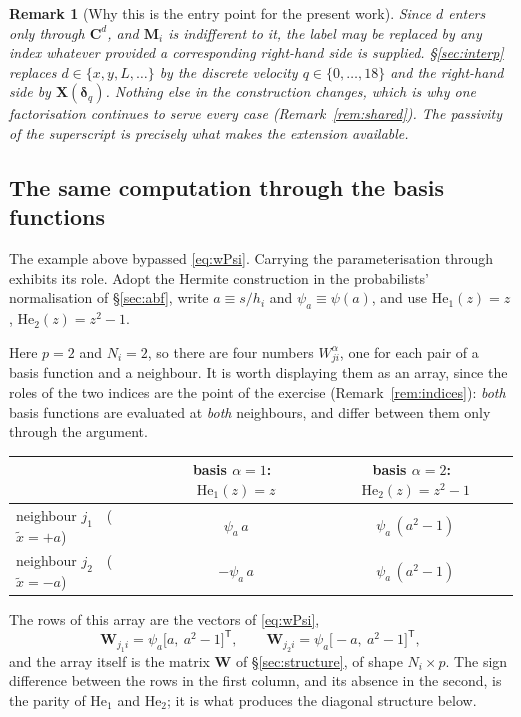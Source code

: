 \documentclass[11pt,a4paper]{article}
\newtheorem{remark}{Remark}
\begin{document}
\begin{remark}[Why this is the entry point for the present work]
\label{rem:d-to-q}
Since $d$ enters only through $\bm C^{d}$, and $\bm M_i$ is indifferent to it, the label
may be replaced by any index whatever provided a corresponding right-hand side is
supplied. \S\ref{sec:interp} replaces $d\in\{x,y,L,\dots\}$ by the discrete velocity
$q\in\{0,\dots,18\}$ and the right-hand side by $\bm X(\bm\delta_q)$. Nothing else in
the construction changes, which is why one factorisation continues to serve every case
(Remark~\ref{rem:shared}). The passivity of the superscript is precisely what makes the
extension available.
\end{remark}

\subsection{The same computation through the basis functions}

The example above bypassed \eqref{eq:wPsi}. Carrying the parameterisation through
exhibits its role. Adopt the Hermite construction in the probabilists' normalisation
of \S\ref{sec:abf}, write $a\equiv s/h_i$ and $\psi_a\equiv\psi(a)$, and use
$\mathrm{He}_1(z)=z$, $\mathrm{He}_2(z)=z^{2}-1$.

Here $p=2$ and $N_i=2$, so there are four numbers $W^{\alpha}_{ji}$, one for each pair
of a basis function and a neighbour. It is worth displaying them as an array, since the
roles of the two indices are the point of the exercise
(Remark~\ref{rem:indices}): \emph{both} basis functions are evaluated at \emph{both}
neighbours, and differ between them only through the argument.
\begin{center}
\begin{tabular}{@{}lcc@{}}
\toprule
& basis $\alpha{=}1$:\ $\mathrm{He}_1(z)=z$
& basis $\alpha{=}2$:\ $\mathrm{He}_2(z)=z^{2}-1$ \\
\midrule
neighbour $j_1$\ \ ($\tilde x=+a$) & $\psi_a\,a$ & $\psi_a\,(a^{2}-1)$ \\
neighbour $j_2$\ \ ($\tilde x=-a$) & $-\psi_a\,a$ & $\psi_a\,(a^{2}-1)$ \\
\bottomrule
\end{tabular}
\end{center}
\noindent The rows of this array are the vectors of \eqref{eq:wPsi},
\begin{equation}
\bm W_{j_1 i}=\psi_a\bigl[a,\ a^{2}-1\bigr]^{\mathsf T},
\qquad
\bm W_{j_2 i}=\psi_a\bigl[-a,\ a^{2}-1\bigr]^{\mathsf T},
\label{eq:exW}
\end{equation}
and the array itself is the matrix $\bm W$ of \S\ref{sec:structure}, of shape
$N_i\times p$. The sign difference between the rows in the first column, and its absence
in the second, is the parity of $\mathrm{He}_1$ and $\mathrm{He}_2$; it is what produces
the diagonal structure below.
\end{document}
